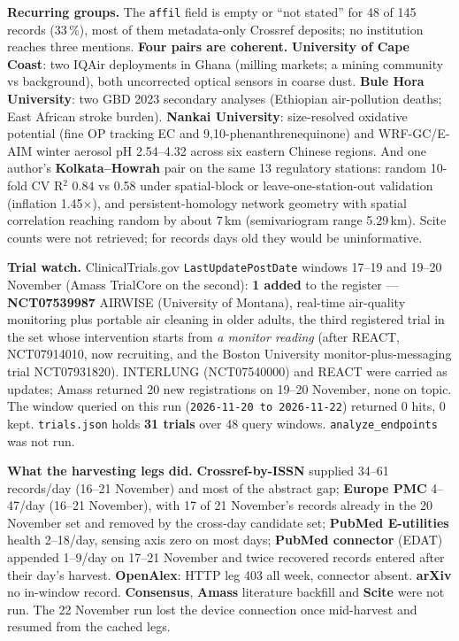 \documentclass[10pt]{article}
\begin{document}
\vspace{1.5mm}
\textbf{Recurring groups.} The \texttt{affil} field is empty or ``not stated'' for 48 of 145 records (33\,\%), most of
them metadata-only Crossref deposits; no institution reaches three mentions. \textbf{Four pairs are coherent.}
\textbf{University of Cape Coast}: two IQAir deployments in Ghana (milling markets; a mining community vs background),
both uncorrected optical sensors in coarse dust. \textbf{Bule Hora University}: two GBD 2023 secondary analyses
(Ethiopian air-pollution deaths; East African stroke burden). \textbf{Nankai University}: size-resolved oxidative
potential (fine OP tracking EC and 9,10-phenanthrenequinone) and WRF-GC/E-AIM winter aerosol pH 2.54--4.32 across
six eastern Chinese regions. And one author's \textbf{Kolkata--Howrah} pair on the same 13 regulatory stations: random
10-fold CV R$^2$ 0.84 vs 0.58 under spatial-block or leave-one-station-out validation (inflation 1.45$\times$), and
persistent-homology network geometry with spatial correlation reaching random by about 7\,km (semivariogram range
5.29\,km). Scite counts were not retrieved; for records days old they would be uninformative.

\vspace{1.5mm}
\textbf{Trial watch.} ClinicalTrials.gov \texttt{LastUpdatePostDate} windows 17--19 and 19--20 November
(Amass TrialCore on the second): \textbf{1 added} to the register --- \textbf{NCT07539987} AIRWISE (University of
Montana), real-time air-quality monitoring plus portable air cleaning in older adults, the third registered trial in
the set whose intervention starts from \emph{a monitor reading} (after REACT, NCT07914010, now recruiting, and the
Boston University monitor-plus-messaging trial NCT07931820). INTERLUNG (NCT07540000) and REACT were carried as updates;
Amass returned 20 new registrations on 19--20 November, none on topic. The window queried on this run (\texttt{2026-11-20 to 2026-11-22}) returned 0 hits, 0 kept. \texttt{trials.json} holds \textbf{31 trials} over 48 query windows. \texttt{analyze\_endpoints} was not run.

\vspace{1.5mm}
\textbf{What the harvesting legs did.} \textbf{Crossref-by-ISSN} supplied 34--61 records/day (16--21 November) and most of the
abstract gap; \textbf{Europe PMC} 4--47/day (16--21 November), with 17 of 21 November's records already in the 20 November set and
removed by the cross-day candidate set; \textbf{PubMed E-utilities} health 2--18/day, sensing axis zero on most days;
\textbf{PubMed connector} (EDAT) appended 1--9/day on 17--21 November and twice recovered records entered after their day's harvest.
\textbf{OpenAlex}: HTTP leg 403 all week, connector absent. \textbf{arXiv} no in-window record. \textbf{Consensus},
\textbf{Amass} literature backfill and \textbf{Scite} were not run. The 22 November run lost the device connection
once mid-harvest and resumed from the cached legs.
\end{document}
